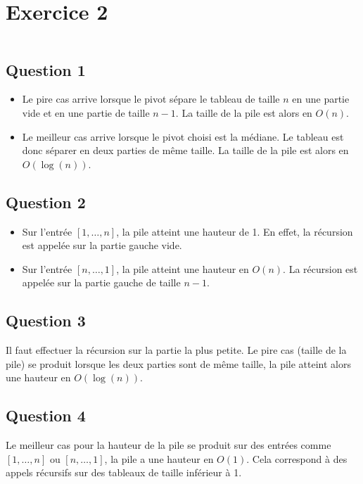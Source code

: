 \documentclass[td7.tex]{subfiles}
\begin{document}
\section*{Exercice 2}
\inputminted{python}{triRapide.py}

\subsection*{Question 1}
\begin{itemize}
\item Le pire cas arrive lorsque le pivot sépare le tableau de taille $n$ en une partie vide et en une partie de taille $n-1$. La taille de la pile est alors en $O(n)$.
\item Le meilleur cas arrive lorsque le pivot choisi est la médiane.
  Le tableau est donc séparer en deux parties de même taille. La taille de la pile est alors en $O(\log(n))$.
\end{itemize}


\subsection*{Question 2}
\begin{itemize}
\item Sur l'entrée $[1, \dots, n]$, la pile atteint une hauteur de 1. En effet, la récursion est appelée sur la partie gauche vide.
\item Sur l'entrée $[n, \dots, 1]$, la pile atteint une hauteur en $O(n)$. La récursion est appelée sur la partie gauche de taille $n-1$. 
\end{itemize}

\subsection*{Question 3}
Il faut effectuer la récursion sur la partie la plus petite.
Le pire cas (taille de la pile) se produit lorsque les deux parties sont de même taille, la pile atteint alors une hauteur en $O(\log(n))$.

\subsection*{Question 4}
Le meilleur cas pour la hauteur de la pile se produit sur des entrées comme $[1, \dots, n]$ ou $[n, \dots, 1]$, la pile a une hauteur en $O(1)$.
Cela correspond à des appels récursifs sur des tableaux de taille inférieur à 1.
\end{document}
